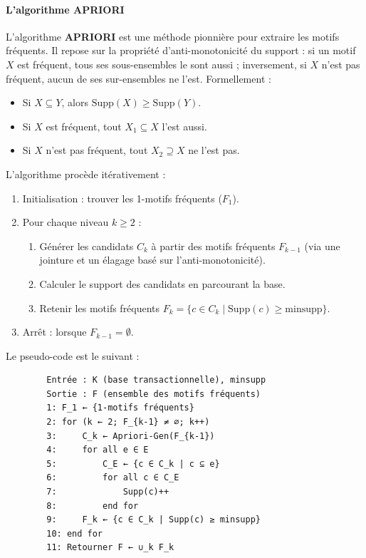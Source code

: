 \documentclass[a4paper,12pt]{report}
\begin{document}
        \paragraph{L’algorithme APRIORI}
        
        L’algorithme \textbf{APRIORI} \cite{AS94} est une méthode pionnière pour extraire les motifs fréquents. Il repose sur la propriété d’anti-monotonicité du support : si un motif \( X \) est fréquent, tous ses sous-ensembles le sont aussi ; inversement, si \( X \) n’est pas fréquent, aucun de ses sur-ensembles ne l’est. Formellement :
        \begin{itemize}
            \item Si \( X \subseteq Y \), alors \( \text{Supp}(X) \geq \text{Supp}(Y) \).
            \item Si \( X \) est fréquent, tout \( X_1 \subseteq X \) l’est aussi.
            \item Si \( X \) n’est pas fréquent, tout \( X_2 \supseteq X \) ne l’est pas.
        \end{itemize}
        
        L’algorithme procède itérativement :
        \begin{enumerate}
            \item Initialisation : trouver les 1-motifs fréquents (\( F_1 \)).
            \item Pour chaque niveau \( k \geq 2 \) :
                \begin{enumerate}
                    \item Générer les candidats \( C_k \) à partir des motifs fréquents \( F_{k-1} \) (via une jointure et un élagage basé sur l’anti-monotonicité).
                    \item Calculer le support des candidats en parcourant la base.
                    \item Retenir les motifs fréquents \( F_k = \{c \in C_k \mid \text{Supp}(c) \geq \text{minsupp}\} \).
                \end{enumerate}
            \item Arrêt : lorsque \( F_{k-1} = \emptyset \).
        \end{enumerate}
        
        Le pseudo-code est le suivant :
        \begin{verbatim}
        Entrée : K (base transactionnelle), minsupp
        Sortie : F (ensemble des motifs fréquents)
        1: F_1 ← {1-motifs fréquents}
        2: for (k ← 2; F_{k-1} ≠ ∅; k++)
        3:     C_k ← Apriori-Gen(F_{k-1})
        4:     for all e ∈ E
        5:         C_E ← {c ∈ C_k | c ⊆ e}
        6:         for all c ∈ C_E
        7:             Supp(c)++
        8:         end for
        9:     F_k ← {c ∈ C_k | Supp(c) ≥ minsupp}
        10: end for
        11: Retourner F ← ∪_k F_k
        \end{verbatim}
        
\end{document}

